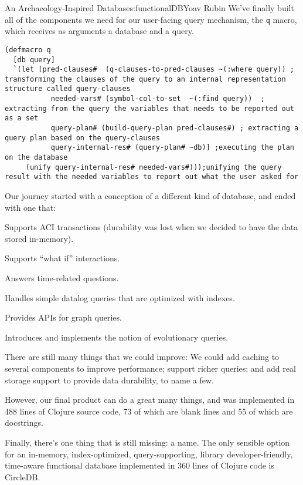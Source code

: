 \begin{aosachapter}{An Archaeology-Inspired Database}{s:functionalDB}{Yoav Rubin}
We've finally built all of the components we need for our user-facing
query mechanism, the \texttt{q} macro, which receives as arguments a
database and a query.

\begin{verbatim}
(defmacro q
  [db query]
  `(let [pred-clauses#  (q-clauses-to-pred-clauses ~(:where query)) ; transforming the clauses of the query to an internal representation structure called query-clauses
           needed-vars# (symbol-col-to-set  ~(:find query))  ; extracting from the query the variables that needs to be reported out as a set
           query-plan# (build-query-plan pred-clauses#) ; extracting a query plan based on the query-clauses
           query-internal-res# (query-plan# ~db)] ;executing the plan on the database
     (unify query-internal-res# needed-vars#)));unifying the query result with the needed variables to report out what the user asked for
\end{verbatim}

\label{summary}

Our journey started with a conception of a different kind of database,
and ended with one that:

\begin{aosaitemize}

\item
  Supports ACI transactions (durability was lost when we decided to have
  the data stored in-memory).
\item
  Supports ``what if'' interactions.
\item
  Answers time-related questions.
\item
  Handles simple datalog queries that are optimized with indexes.
\item
  Provides APIs for graph queries.
\item
  Introduces and implements the notion of evolutionary queries.
\end{aosaitemize}

There are still many things that we could improve: We could add caching
to several components to improve performance; support richer queries;
and add real storage support to provide data durability, to name a few.

However, our final product can do a great many things, and was
implemented in 488 lines of Clojure source code, 73 of which are blank
lines and 55 of which are docstrings.

Finally, there's one thing that is still missing: a name. The only
sensible option for an in-memory, index-optimized, query-supporting,
library developer-friendly, time-aware functional database implemented
in 360 lines of Clojure code is CircleDB.

\end{aosachapter}
